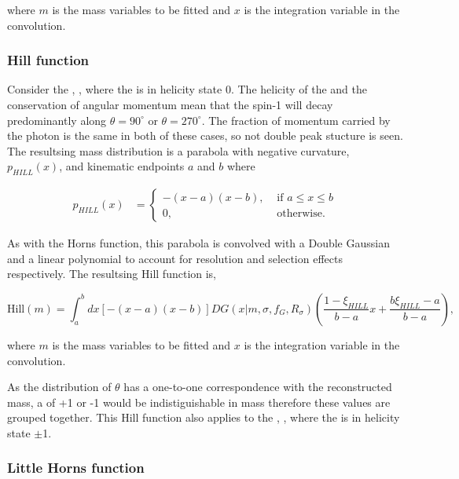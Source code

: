 where $m$ is the mass variables to be fitted and $x$ is the integration variable in the convolution.

\subsubsection{Hill function}

Consider the \decay{\Bm}{\Dstarz\Kstarm}, \decay{\Dstarz}{\Dz\gamma}, where the \Dstarz is in helicity state 0. The helicity of the \Dstarz and the conservation of angular momentum mean that the spin-1 \Pgamma will decay predominantly along $\theta = 90^{\circ}$ or $\theta = 270^{\circ}$. The fraction of momentum carried by the photon is the same in both of these cases, so not double peak stucture is seen. The resultsing \B mass distribution is a parabola with negative curvature, $p_{HILL}(x)$, and kinematic endpoints $a$ and $b$ where

\begin{align}
p_{HILL}(x) &= \begin{cases}
-(x - a)(x - b), & \text{ if $a \leq x \leq b$}\\ 	
0, & \text{ otherwise.}
\end{cases} 
\end{align}

As with the Horns function, this parabola is convolved with a Double Gaussian and a linear polynomial to account for resolution and selection effects respectively. The resultsing Hill function is,

\begin{equation}
\text{Hill}(m) = \int_a^b dx \left[-(x - a)(x - b)\right] DG(x|m,\sigma,f_G,R_{\sigma}) \left( \frac{1 - \xi_{HILL}}{b - a}x + \frac{b\xi_{HILL} - a}{b - a}\right),
\label{eqn:hill}
\end{equation}

where $m$ is the mass variables to be fitted and $x$ is the integration variable in the convolution.

As the distribution of $\theta$ has a one-to-one correspondence with the reconstructed \B mass, a \Dstar of +1 or -1 would be indistiguishable in \B mass therefore these values are grouped together. This Hill function also applies to the \decay{\Bm}{\Dstarz\Kstarm}, \decay{\Dstarz}{\Dz\piz}, where the \Dstarz is in helicity state $\pm$1.

\subsubsection{Little Horns function}

